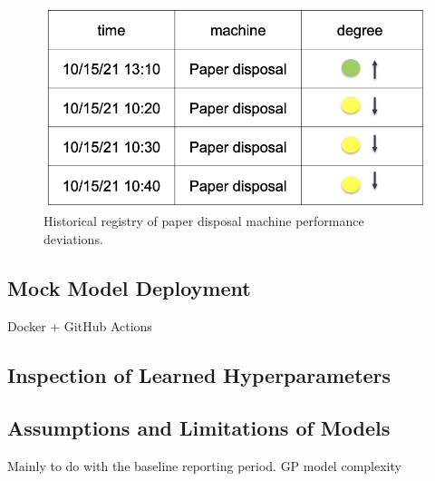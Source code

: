 \begin{figure}[h]
\centering
\graphicspath{ {./images/} }
\includegraphics[scale=0.49]{images/entsorgung_registry.png}
\caption{Historical registry of paper disposal machine performance deviations. }
\end{figure}





\subsection{Mock Model Deployment}

Docker + GitHub Actions

\subsection{Inspection of Learned Hyperparameters}

\subsection{Assumptions and Limitations of Models}

Mainly to do with the baseline reporting period. GP model complexity